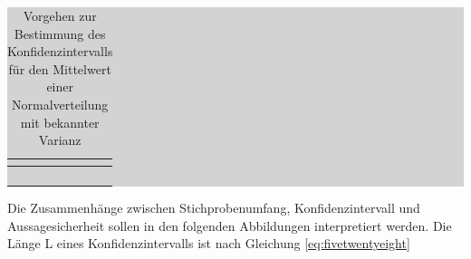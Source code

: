 \begin{table}[H]
\setlength{\arrayrulewidth}{.1em}
\caption{Vorgehen zur Bestimmung des Konfidenzintervalls f\"{u}r den Mittelwert einer Normalverteilung mit bekannter Varianz}
\setlength{\fboxsep}{0pt}%
\colorbox{lightgray}{%
%
\begin{tabular}{| c | c |}
\hline
\parbox[c][0.3in][c]{0.4in}{\smallskip\centering\textbf{\selectfont{Nr.}}} & 
\parbox[c][0.3in][c]{6.2in}{\smallskip\centering\textbf{\selectfont{Prozessschritt}}}\\ \hline

\parbox[c][0.3in][c]{0.4in}{\centering{}\selectfont{1}} & 
\parbox[c][0.3in][c]{6.2in}{\centering{}\selectfont{Wahl einer Konfidenzzahl $\gamma$}}\\ \hline

\parbox[c][0.9in][c]{0.4in}{\centering{}\selectfont{2}} & 
\parbox[c][0.9in][c]{6.2in}{\centering{}}\\ \hline

\parbox[c][0.9in][c]{0.4in}{\centering{}\selectfont{3}} & 
\parbox[c][0.9in][c]{6.2in}{\centering{}}\\ \hline

\parbox[c][0.9in][c]{0.4in}{\centering{}\selectfont{4}} & 
\parbox[c][0.9in][c]{6.2in}{\centering{}}\\ \hline

\end{tabular}%
}
\label{tab:fivetwo}
\end{table}

\noindent Die Zusammenh\"{a}nge zwischen Stichprobenumfang, Konfidenzintervall und Aussagesicherheit sollen in den folgenden Abbildungen interpretiert werden. Die L\"{a}nge L eines Konfidenzintervalls ist nach Gleichung \eqref{eq:fivetwentyeight}

